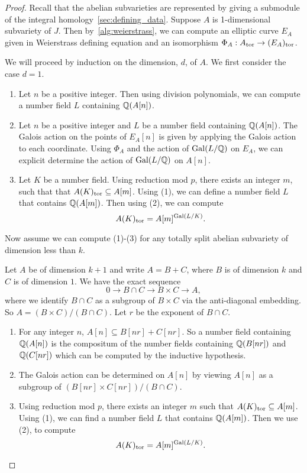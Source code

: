 \begin{proof}
    Recall that the abelian subvarieties are represented by giving a submodule
    of the integral homology~\ref{sec:defining_data}. Suppose $A$ is
    1-dimensional subvariety of $J$. Then by~\ref{alg:weierstrass}, we can
    compute an elliptic curve $E_A$ given in Weierstrass defining equation and
    an isomorphism $\Phi_A:A_{\mathrm{tor}}\to (E_A)_{\mathrm{tor}}$.

    We will proceed by induction on the dimension, $d$, of $A$. We first
    consider the case $d=1$.
    \begin{enumerate}
        \item
            Let $n$ be a positive integer. Then using division polynomials, we
            can compute a number field $L$ containing $\mathbb{Q}(A[n])$.
        \item
            Let $n$ be a positive integer and $L$ be a number field containing
            $\mathbb{Q}(A[n])$. The Galois action on the points of $E_A[n]$ is given
            by applying the Galois action to each coordinate. Using $\Phi_A$
            and the action of $\operatorname{Gal}(L/\mathbb{Q})$ on $E_A$, we can explicit determine
            the action of $\operatorname{Gal}(L/\mathbb{Q})$ on $A[n]$.
        \item
            Let $K$ be a number field. Using reduction mod $p$, there exists an
            integer $m$, such that that $A(K)_{\mathrm{tor}} \subseteq A[m]$. Using (1),
            we can define a number field $L$ that contains $\mathbb{Q}(A[m])$. Then
            using (2), we can compute
            \[
                A(K)_{\mathrm{tor}} = A[m]^{\operatorname{Gal}(L/K)}.
            \]
    \end{enumerate}

    Now assume we can compute (1)-(3) for any totally split abelian subvariety
    of dimension less than $k$.

    Let $A$ be of dimension $k+1$ and write $A=B+C$, where $B$ is of
    dimension $k$ and $C$ is of dimension $1$.  We have the exact sequence
    \[
        0\to B\cap C \to B\times C \to A,
    \]
    where we identify $B\cap C$ as a subgroup of $B\times C$ via the
    anti-diagonal embedding. So $A=(B\times C)/(B\cap C)$. Let $r$ be the
    exponent of $B\cap C$.
    \begin{enumerate}
        \item
            For any integer $n$, $A[n] \subseteq B[nr]+C[nr]$. So a number
            field containing $\mathbb{Q}(A[n])$ is the compositum  of the number
            fields containing $\mathbb{Q}(B[nr])$ and $\mathbb{Q}(C[nr])$ which can be
            computed by the inductive hypothesis.
        \item
            The Galois action can be determined on $A[n]$ by viewing $A[n]$ as
            a subgroup of $(B[nr]\times C[nr])/(B\cap C)$.
        \item
            Using reduction mod $p$, there exists an integer $m$ such that
            $A(K)_{\mathrm{tor}}\subseteq A[m]$. Using (1), we can find a number field
            $L$ that contains $\mathbb{Q}(A[m])$. Then we use (2), to compute
            \[
                A(K)_{\mathrm{tor}} = A[m]^{\operatorname{Gal}(L/K)}.
            \]
    \end{enumerate}
\end{proof}

